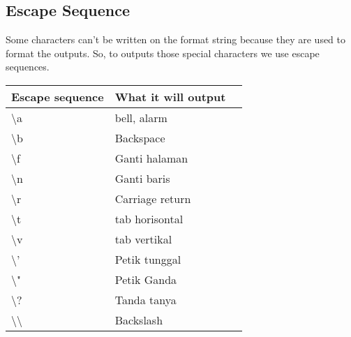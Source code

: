 \subsection{Escape Sequence}
Some characters can't be written on the format string because they are used to format the outputs.
So, to outputs those special characters we use escape sequences.

\begin{table}[H]
	\centering
	\begin{tabular}{|l|l|l|}
		\hline
		Escape sequence & What it will output &  \\ \hline
		\textbackslash{}a & bell, alarm &  \\ \hline
		\textbackslash{}b & Backspace &  \\ \hline
		\textbackslash{}f & Ganti halaman &  \\ \hline
		\textbackslash{}n & Ganti baris &  \\ \hline
		\textbackslash{}r & Carriage return &  \\ \hline
		\textbackslash{}t & tab horisontal&  \\ \hline
		\textbackslash{}v & tab vertikal &  \\ \hline
		\textbackslash{}' & Petik tunggal  &  \\ \hline
		\textbackslash{}" & Petik Ganda &  \\ \hline
		\textbackslash{}? & Tanda tanya &  \\ \hline
		\textbackslash{}\textbackslash{} & Backslash &  \\ \hline
	\end{tabular}
\end{table}

